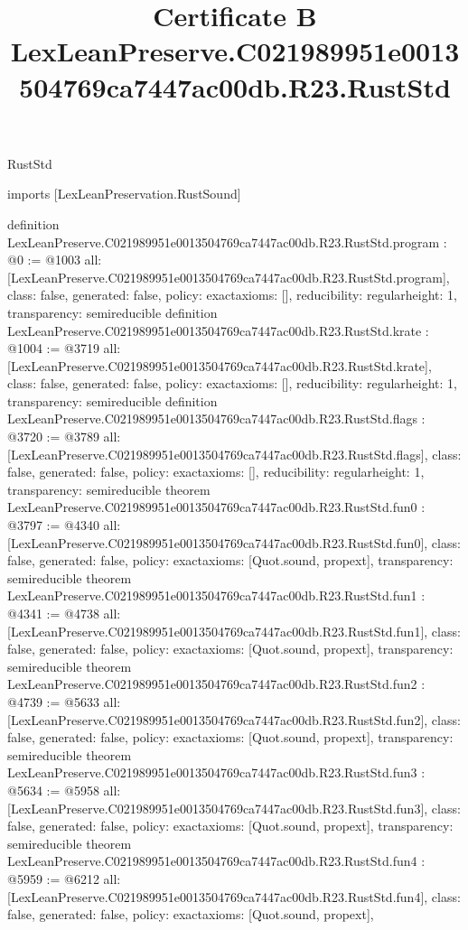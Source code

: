 \begin{lexlean}{RustStd}
\title{Certificate B LexLeanPreserve.C021989951e0013504769ca7447ac00db.R23.RustStd}
\begin{coremodule}
imports [LexLeanPreservation.RustSound]

definition LexLeanPreserve.C021989951e0013504769ca7447ac00db.R23.RustStd.program : @0 := @1003 {
  all: [LexLeanPreserve.C021989951e0013504769ca7447ac00db.R23.RustStd.program],
  class: false,
  generated: false,
  policy: exact{axioms: []},
  reducibility: regular{height: 1},
  transparency: semireducible
}
definition LexLeanPreserve.C021989951e0013504769ca7447ac00db.R23.RustStd.krate : @1004 := @3719 {
  all: [LexLeanPreserve.C021989951e0013504769ca7447ac00db.R23.RustStd.krate],
  class: false,
  generated: false,
  policy: exact{axioms: []},
  reducibility: regular{height: 1},
  transparency: semireducible
}
definition LexLeanPreserve.C021989951e0013504769ca7447ac00db.R23.RustStd.flags : @3720 := @3789 {
  all: [LexLeanPreserve.C021989951e0013504769ca7447ac00db.R23.RustStd.flags],
  class: false,
  generated: false,
  policy: exact{axioms: []},
  reducibility: regular{height: 1},
  transparency: semireducible
}
theorem LexLeanPreserve.C021989951e0013504769ca7447ac00db.R23.RustStd.fun0 : @3797 := @4340 {
  all: [LexLeanPreserve.C021989951e0013504769ca7447ac00db.R23.RustStd.fun0],
  class: false,
  generated: false,
  policy: exact{axioms: [Quot.sound, propext]},
  transparency: semireducible
}
theorem LexLeanPreserve.C021989951e0013504769ca7447ac00db.R23.RustStd.fun1 : @4341 := @4738 {
  all: [LexLeanPreserve.C021989951e0013504769ca7447ac00db.R23.RustStd.fun1],
  class: false,
  generated: false,
  policy: exact{axioms: [Quot.sound, propext]},
  transparency: semireducible
}
theorem LexLeanPreserve.C021989951e0013504769ca7447ac00db.R23.RustStd.fun2 : @4739 := @5633 {
  all: [LexLeanPreserve.C021989951e0013504769ca7447ac00db.R23.RustStd.fun2],
  class: false,
  generated: false,
  policy: exact{axioms: [Quot.sound, propext]},
  transparency: semireducible
}
theorem LexLeanPreserve.C021989951e0013504769ca7447ac00db.R23.RustStd.fun3 : @5634 := @5958 {
  all: [LexLeanPreserve.C021989951e0013504769ca7447ac00db.R23.RustStd.fun3],
  class: false,
  generated: false,
  policy: exact{axioms: [Quot.sound, propext]},
  transparency: semireducible
}
theorem LexLeanPreserve.C021989951e0013504769ca7447ac00db.R23.RustStd.fun4 : @5959 := @6212 {
  all: [LexLeanPreserve.C021989951e0013504769ca7447ac00db.R23.RustStd.fun4],
  class: false,
  generated: false,
  policy: exact{axioms: [Quot.sound, propext]},
}
\end{coremodule}
\end{lexlean}
